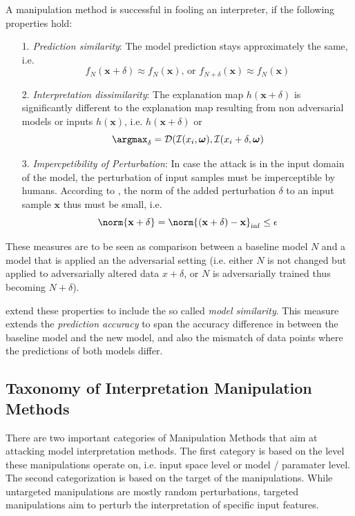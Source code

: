 A manipulation method is successful in fooling an interpreter, if the following properties hold: 
\begin{enumerate}
    \item[1.] \textit{Prediction similarity}: The model prediction stays approximately the same, i.e. $$f_N(\mathbf{x}+\delta) \approx f_N(\mathbf{x}) \text{, or } f_{N+\delta}(\mathbf{x}) \approx f_N(\mathbf{x})$$
    \item[2.] \textit{Interpretation dissimilarity}: The explanation map $h(\mathbf{x}+\delta)$ is significantly different to the explanation map resulting from non adversarial models or inputs $h(\mathbf{x})$, i.e. $h(\mathbf{x}+\delta)$ or $$\argmax_{\delta} = \mathcal{D}(\mathcal{I}(x_i, \boldsymbol{\omega}), \mathcal{I}(x_i+\delta, \boldsymbol{\omega})$$
    \item[3.] \textit{Impercpetibility of Perturbation}: In case the attack is in the input domain of the model, the perturbation of input samples must be imperceptible by humans. According to \cite{dombrowski2019explanations}, the norm of the added perturbation $\delta$ to an input sample $\mathbf{x}$ thus must be small, i.e. $$\norm{\mathbf{x}+\delta} = \norm{(\mathbf{x}+\delta)-\mathbf{x}}_{\inf} \leq \epsilon$$ %
\end{enumerate}
\setlength{\leftskip}{0cm}

These measures are to be seen as comparison between a baseline model $N$ and a model that is applied an the adversarial setting (i.e. either $N$ is not changed but applied to adversarially altered data $x+\delta$, or $N$ is adversarially trained thus becoming $N+\delta$). 

\cite{dimanov2020you} extend these properties to include the so called \textit{model similarity}. This measure extends the \textit{prediction accuracy} to span the accuracy difference in between the baseline model and the new model, and also the mismatch of data points where the predictions of both models differ. 

\subsection{Taxonomy of Interpretation Manipulation Methods}
\label{subsec:taxonomy_manipulations}
There are two important categories of Manipulation Methods that aim at attacking model interpretation methods. The first category is based on the level these manipulations operate on, i.e. input space level or model / paramater level. 
The second categorization is based on the target of the manipulations. While untargeted manipulations are mostly random perturbations, targeted manipulations aim to perturb the interpretation of specific input features. 

